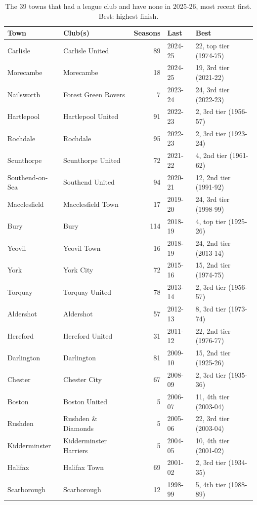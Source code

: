 \documentclass[11pt,a4paper]{article}
\begin{document}
\begin{table}[tbp]\centering\scriptsize\caption{The 39 towns that had a league club and have none in 2025-26, most recent first. Best: highest finish.}\label{tab:lost}\begin{tabular}{llrll}\toprule Town & Club(s) & Seasons & Last & Best\\\midrule
Carlisle & Carlisle United & 89 & 2024-25 & 22, top tier (1974-75)\\
Morecambe & Morecambe & 18 & 2024-25 & 19, 3rd tier (2021-22)\\
Nailsworth & Forest Green Rovers & 7 & 2023-24 & 24, 3rd tier (2022-23)\\
Hartlepool & Hartlepool United & 91 & 2022-23 & 2, 3rd tier (1956-57)\\
Rochdale & Rochdale & 95 & 2022-23 & 2, 3rd tier (1923-24)\\
Scunthorpe & Scunthorpe United & 72 & 2021-22 & 4, 2nd tier (1961-62)\\
Southend-on-Sea & Southend United & 94 & 2020-21 & 12, 2nd tier (1991-92)\\
Macclesfield & Macclesfield Town & 17 & 2019-20 & 24, 3rd tier (1998-99)\\
Bury & Bury & 114 & 2018-19 & 4, top tier (1925-26)\\
Yeovil & Yeovil Town & 16 & 2018-19 & 24, 2nd tier (2013-14)\\
York & York City & 72 & 2015-16 & 15, 2nd tier (1974-75)\\
Torquay & Torquay United & 78 & 2013-14 & 2, 3rd tier (1956-57)\\
Aldershot & Aldershot & 57 & 2012-13 & 8, 3rd tier (1973-74)\\
Hereford & Hereford United & 31 & 2011-12 & 22, 2nd tier (1976-77)\\
Darlington & Darlington & 81 & 2009-10 & 15, 2nd tier (1925-26)\\
Chester & Chester City & 67 & 2008-09 & 2, 3rd tier (1935-36)\\
Boston & Boston United & 5 & 2006-07 & 11, 4th tier (2003-04)\\
Rushden & Rushden \& Diamonds & 5 & 2005-06 & 22, 3rd tier (2003-04)\\
Kidderminster & Kidderminster Harriers & 5 & 2004-05 & 10, 4th tier (2001-02)\\
Halifax & Halifax Town & 69 & 2001-02 & 2, 3rd tier (1934-35)\\
Scarborough & Scarborough & 12 & 1998-99 & 5, 4th tier (1988-89)\\

\end{tabular}
\end{table}
\end{document}
